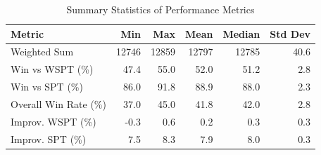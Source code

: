 \begin{table}[htbp]%
\centering%
\begin{tabular}{lrrrrr}%
\toprule%
\textbf{Metric}&\textbf{Min}&\textbf{Max}&\textbf{Mean}&\textbf{Median}&\textbf{Std Dev}\\%
\midrule%
Weighted Sum&12746&12859&12797&12785&40.6\\%
Win vs WSPT (\%)&47.4&55.0&52.0&51.2&2.8\\%
Win vs SPT (\%)&86.0&91.8&88.9&88.0&2.3\\%
Overall Win Rate (\%)&37.0&45.0&41.8&42.0&2.8\\%
Improv. WSPT (\%)&-0.3&0.6&0.2&0.3&0.3\\%
Improv. SPT (\%)&7.5&8.3&7.9&8.0&0.3\\%
\bottomrule%
\end{tabular}%
\caption{Summary Statistics of Performance Metrics}%
\label{tab:metrics}%
\end{table}